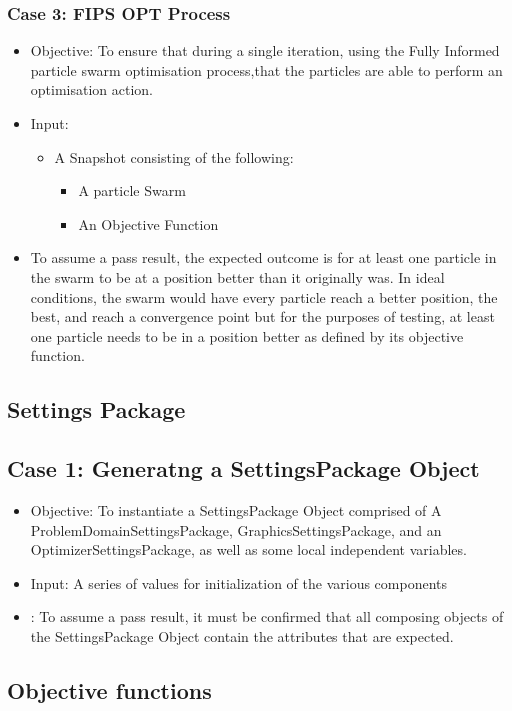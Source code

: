 \documentclass[11pt]{article}
\begin{document}
\subsubsection{Case 3: FIPS OPT Process}
\begin{itemize}
    \item Objective: To ensure that during a single iteration, using the Fully Informed particle swarm optimisation process,that the particles are able to perform an optimisation action.
    \item Input: \begin{itemize}
    \item A Snapshot consisting of the following:
    	\begin{itemize}
    	\item A particle Swarm
    	\item An Objective Function
    	\end{itemize}
    \end{itemize}
    \item To assume a pass result, the expected outcome is for at least one particle in the swarm to be at a position better than it originally was. In ideal conditions, the swarm would have every particle reach a better position, the best, and reach a convergence point but for the purposes of testing, at least one particle needs to be in a position better as defined by its objective function.
\end{itemize}
\subsection{Settings Package}
\subsection{Case 1: Generatng a SettingsPackage Object}
\begin{itemize}
    \item Objective: To instantiate a SettingsPackage Object comprised of A ProblemDomainSettingsPackage, GraphicsSettingsPackage, and an OptimizerSettingsPackage, as well as some local independent variables.
    \item Input: A series of values for initialization of the various components
    \item: To assume a pass result, it must be confirmed that all composing objects of the SettingsPackage Object contain the attributes that are expected.
    \end{itemize}
\subsection{Objective functions}
\end{document}
